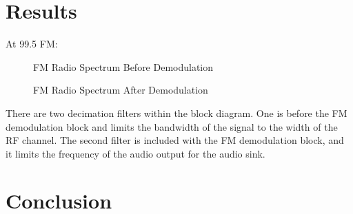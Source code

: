\documentclass{article}
\begin{document}
\section{Results}

At 99.5 FM:

\begin{figure}[H]
	\centerline{}
	\caption{FM Radio Spectrum Before Demodulation}
	\label{fig::spectrum_before_demodulation}
\end{figure}

\begin{figure}[H]
	\centerline{}
	\caption{FM Radio Spectrum After Demodulation}
	\label{fig::spectrum_after_demodulation}
\end{figure}

There are two decimation filters within the block diagram. One is before the FM demodulation block and limits the bandwidth of the signal to the width of the RF channel. The second filter is included with the FM demodulation block, and it limits the frequency of the audio output for the audio sink.

\section{Conclusion}

%
%
	
\end{document}
